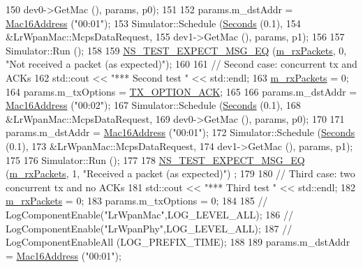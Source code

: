 \begin{DoxyCode}
150                        dev0->GetMac (), params, p0);
151 
152   params.m\_dstAddr = \hyperlink{classns3_1_1Mac16Address}{Mac16Address} (\textcolor{stringliteral}{"00:01"});
153   Simulator::Schedule (\hyperlink{group__timecivil_ga33c34b816f8ff6628e33d5c8e9713b9e}{Seconds} (0.1),
154                        &LrWpanMac::McpsDataRequest,
155                        dev1->GetMac (), params, p1);
156 
157   Simulator::Run ();
158 
159   \hyperlink{group__testing_ga7304ba46a28d8cf08dfdfd6499cf7068}{NS\_TEST\_EXPECT\_MSG\_EQ} (\hyperlink{classLrWpanCollisionTestCase_a99c5c25759f67c884349444a74a86186}{m\_rxPackets}, 0, \textcolor{stringliteral}{"Not received a packet (as
       expected)"});
160 
161   \textcolor{comment}{// Second case: concurrent tx and ACKs}
162   std::cout << \textcolor{stringliteral}{"*** Second test "} << std::endl;
163   \hyperlink{classLrWpanCollisionTestCase_a99c5c25759f67c884349444a74a86186}{m\_rxPackets} = 0;
164   params.m\_txOptions = \hyperlink{group__lr-wpan_gga74ea891230ebf45d80d69a67266930a4a270a37d12b62bb8b5e92d646456244cf}{TX\_OPTION\_ACK};
165 
166   params.m\_dstAddr = \hyperlink{classns3_1_1Mac16Address}{Mac16Address} (\textcolor{stringliteral}{"00:02"});
167   Simulator::Schedule (\hyperlink{group__timecivil_ga33c34b816f8ff6628e33d5c8e9713b9e}{Seconds} (0.1),
168                        &LrWpanMac::McpsDataRequest,
169                        dev0->GetMac (), params, p0);
170 
171   params.m\_dstAddr = \hyperlink{classns3_1_1Mac16Address}{Mac16Address} (\textcolor{stringliteral}{"00:01"});
172   Simulator::Schedule (\hyperlink{group__timecivil_ga33c34b816f8ff6628e33d5c8e9713b9e}{Seconds} (0.1),
173                        &LrWpanMac::McpsDataRequest,
174                        dev1->GetMac (), params, p1);
175 
176   Simulator::Run ();
177 
178   \hyperlink{group__testing_ga7304ba46a28d8cf08dfdfd6499cf7068}{NS\_TEST\_EXPECT\_MSG\_EQ} (\hyperlink{classLrWpanCollisionTestCase_a99c5c25759f67c884349444a74a86186}{m\_rxPackets}, 1, \textcolor{stringliteral}{"Received a packet (as expected)"})
      ;
179 
180   \textcolor{comment}{// Third case: two concurrent tx and no ACKs}
181   std::cout << \textcolor{stringliteral}{"*** Third test "} << std::endl;
182   \hyperlink{classLrWpanCollisionTestCase_a99c5c25759f67c884349444a74a86186}{m\_rxPackets} = 0;
183   params.m\_txOptions = 0;
184 
185 \textcolor{comment}{//  LogComponentEnable("LrWpanMac",LOG\_LEVEL\_ALL);}
186 \textcolor{comment}{//  LogComponentEnable("LrWpanPhy",LOG\_LEVEL\_ALL);}
187 \textcolor{comment}{//  LogComponentEnableAll (LOG\_PREFIX\_TIME);}
188 
189   params.m\_dstAddr = \hyperlink{classns3_1_1Mac16Address}{Mac16Address} (\textcolor{stringliteral}{"00:01"});

\end{DoxyCode}
